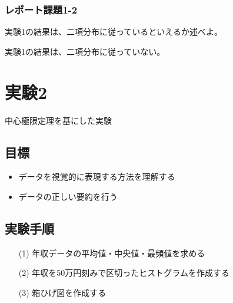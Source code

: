 \documentclass[12pt]{jarticle}
\begin{document}
\subsubsection*{レポート課題1-2}
\begin{shadebox}
    実験1の結果は、二項分布に従っているといえるか述べよ。
\end{shadebox}
実験1の結果は、二項分布に従っていない。


\section{実験2}
中心極限定理を基にした実験

\subsection{目標}
\begin{itemize}
    \item データを視覚的に表現する方法を理解する
    \item データの正しい要約を行う
\end{itemize}

\subsection{実験手順}
\begin{itemize}
    \item[(1)] 年収データの平均値・中央値・最頻値を求める
    \item[(2)] 年収を50万円刻みで区切ったヒストグラムを作成する
    \item[(3)] 箱ひげ図を作成する
\end{itemize}
\end{document}
